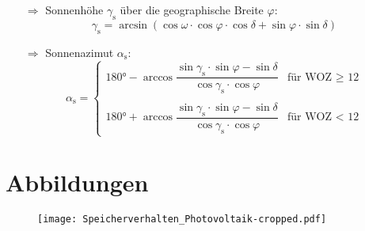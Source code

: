 \begin{enumerate}
\item[$\Rightarrow$] Sonnenhöhe $\gamma_\text{s}$ über die geographische Breite $\varphi$:
	\begin{equation*}
		\gamma_\text{s} = \arcsin(\cos\omega \cdot \cos\varphi \cdot \cos\delta + \sin\varphi \cdot \sin\delta)
	\end{equation*}
\item[$\Rightarrow$] Sonnenazimut $\alpha_\text{s}$:
	\begin{equation*}
		\alpha_\text{s} = 	\begin{cases}
								180\text{°} - \arccos\dfrac{\sin\gamma_\text{s} \cdot \sin\varphi - \sin\delta}{\cos\gamma_\text{s} \cdot \cos\varphi} & \text{für WOZ $\geq$ 12}\\
								\\
								180\text{°} + \arccos\dfrac{\sin\gamma_\text{s} \cdot \sin\varphi - \sin\delta}{\cos\gamma_\text{s} \cdot \cos\varphi} & \text{für WOZ $<$ 12}
							\end{cases}
	\end{equation*}
\end{enumerate}

\section*{Abbildungen}
	\begin{figure*}[ht]
		\centering
		\texttt{[image: Speicherverhalten\_Photovoltaik-cropped.pdf]}
		\label{Anhang: Ladezustand}
	\end{figure*}